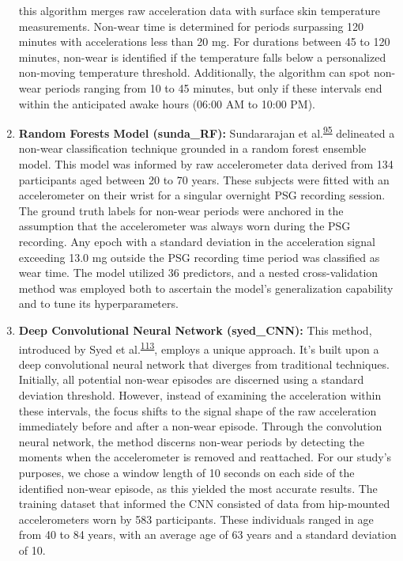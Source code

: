 \documentclass[
  10pt,
]{scrbook}
\let\originaltextbf\textbf
\renewcommand{\textbf}[1]{\textcolor{color1}{\textsf{\originaltextbf{#1}}}}
\begin{document}
\begin{enumerate}
  this algorithm merges raw acceleration data with surface skin
  temperature measurements. Non-wear time is determined for periods
  surpassing 120 minutes with accelerations less than 20 mg. For
  durations between 45 to 120 minutes, non-wear is identified if the
  temperature falls below a personalized non-moving temperature
  threshold. Additionally, the algorithm can spot non-wear periods
  ranging from 10 to 45 minutes, but only if these intervals end within
  the anticipated awake hours (06:00 AM to 10:00 PM).
\item
  \textsf{\textbf{Random Forests Model (sunda\_RF):}} Sundararajan et
  al.\textsuperscript{\protect\hyperlink{ref-sundararajan_sleep_2021}{95}}
  delineated a non-wear classification technique grounded in a random
  forest ensemble model. This model was informed by raw accelerometer
  data derived from 134 participants aged between 20 to 70 years. These
  subjects were fitted with an accelerometer on their wrist for a
  singular overnight PSG recording session. The ground truth labels for
  non-wear periods were anchored in the assumption that the
  accelerometer was always worn during the PSG recording. Any epoch with
  a standard deviation in the acceleration signal exceeding 13.0 mg
  outside the PSG recording time period was classified as wear time. The
  model utilized 36 predictors, and a nested cross-validation method was
  employed both to ascertain the model's generalization capability and
  to tune its hyperparameters.
\item
  \textsf{\textbf{Deep Convolutional Neural Network (syed\_CNN):}} This
  method, introduced by Syed et
  al.\textsuperscript{\protect\hyperlink{ref-syed_novel_2021}{113}},
  employs a unique approach. It's built upon a deep convolutional neural
  network that diverges from traditional techniques. Initially, all
  potential non-wear episodes are discerned using a standard deviation
  threshold. However, instead of examining the acceleration within these
  intervals, the focus shifts to the signal shape of the raw
  acceleration immediately before and after a non-wear episode. Through
  the convolution neural network, the method discerns non-wear periods
  by detecting the moments when the accelerometer is removed and
  reattached. For our study's purposes, we chose a window length of 10
  seconds on each side of the identified non-wear episode, as this
  yielded the most accurate results. The training dataset that informed
  the CNN consisted of data from hip-mounted accelerometers worn by 583
  participants. These individuals ranged in age from 40 to 84 years,
  with an average age of 63 years and a standard deviation of 10.
\end{enumerate}
\end{document}
